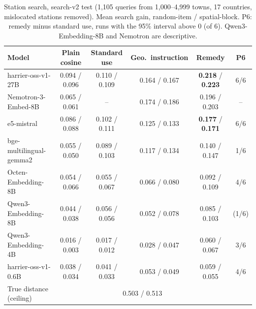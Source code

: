 \begin{table}[t]
\centering
\footnotesize
\caption{Station search, search-v2 test (1,105 queries from 1,000--4,999 towns, 17 countries, mislocated stations removed). Mean search gain, random-item / spatial-block. P6: remedy minus standard use, runs with the 95\% interval above 0 (of 6). Qwen3-Embedding-8B and Nemotron are descriptive.}
\label{tab:search2}
\begin{tabular}{@{}lccccc@{}}
\toprule
Model & Plain cosine & Standard use & Geo.\ instruction & Remedy & P6 \\
\midrule
harrier-oss-v1-27B & 0.094 / 0.096 & 0.110 / 0.109 & 0.164 / 0.167 & \textbf{0.218} / \textbf{0.223} & 6/6 \\
Nemotron-3-Embed-8B & 0.065 / 0.061 & -- & 0.174 / 0.186 & 0.196 / 0.203 & -- \\
e5-mistral & 0.086 / 0.088 & 0.102 / 0.111 & 0.125 / 0.133 & \textbf{0.177} / \textbf{0.171} & 6/6 \\
bge-multilingual-gemma2 & 0.055 / 0.050 & 0.089 / 0.103 & 0.117 / 0.134 & 0.140 / 0.147 & 1/6 \\
Octen-Embedding-8B & 0.054 / 0.066 & 0.055 / 0.067 & 0.066 / 0.080 & 0.092 / 0.109 & 4/6 \\
Qwen3-Embedding-8B & 0.044 / 0.038 & 0.056 / 0.056 & 0.052 / 0.078 & 0.085 / 0.103 & (1/6) \\
Qwen3-Embedding-4B & 0.016 / 0.003 & 0.017 / 0.012 & 0.028 / 0.047 & 0.060 / 0.067 & 3/6 \\
harrier-oss-v1-0.6B & 0.038 / 0.034 & 0.041 / 0.033 & 0.053 / 0.049 & 0.059 / 0.055 & 4/6 \\
\midrule
True distance (ceiling) & \multicolumn{4}{c}{0.503 / 0.513} & \\
\bottomrule
\end{tabular}
\end{table}
